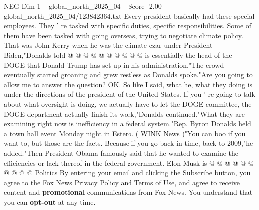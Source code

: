 \begin{textsample}{NEG Dim 1 – global\_north\_2025\_04 – Score -2.00 – global\_north\_2025\_04/123842364.txt}
Every president basically had these special employees.
They ' re tasked with specific duties, specific responsibilities.
Some of them have been tasked with going overseas, trying to negotiate climate policy.
That was John Kerry when he was the climate czar under President Biden,"Donalds told @ @ @ @ @ @ @ @ @ @ is essentially the head of the DOGE that Donald Trump has set up in his administration."The crowd eventually started groaning and grew restless as Donalds spoke."Are you going to allow me to answer the question?
OK.
So like I said, what he, what they doing is under the directions of the president of the United States.
If you ' re going to talk about what oversight is doing, we actually have to let the DOGE committee, the DOGE department actually finish its work,"Donalds continued."What they are examining right now is inefficiency in a federal system."Rep.
Byron Donalds held a town hall event Monday night in Estero. ( WINK News )"You can boo if you want to, but those are the facts.
Because if you go back in time, back to 2009,"he added."Then-President Obama famously said that he wanted to examine the efficiencies or lack thereof in the federal government.
Elon Musk is @ @ @ @ @ @ @ @ @ @ Politics By entering your email and clicking the Subscribe button, you agree to the Fox News Privacy Policy and Terms of Use, and agree to receive content and \textbf{promotional} communications from Fox News.
You understand that you can \textbf{opt-out} at any time.

\end{textsample}
